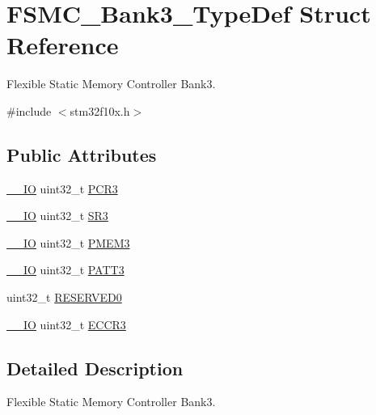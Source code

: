 \hypertarget{struct_f_s_m_c___bank3___type_def}{\section{F\-S\-M\-C\-\_\-\-Bank3\-\_\-\-Type\-Def Struct Reference}
\label{struct_f_s_m_c___bank3___type_def}
}


Flexible Static Memory Controller Bank3.  




{\ttfamily \#include $<$stm32f10x.\-h$>$}

\subsection*{Public Attributes}
\begin{DoxyCompactItemize}
\item 
\hyperlink{group___c_m_s_i_s__core__definitions_gaec43007d9998a0a0e01faede4133d6be}{\-\_\-\-\_\-\-I\-O} uint32\-\_\-t \hyperlink{struct_f_s_m_c___bank3___type_def_a1f772e1028641cab7b923bf02115b919}{P\-C\-R3}
\item 
\hyperlink{group___c_m_s_i_s__core__definitions_gaec43007d9998a0a0e01faede4133d6be}{\-\_\-\-\_\-\-I\-O} uint32\-\_\-t \hyperlink{struct_f_s_m_c___bank3___type_def_ab89f16f64018a1f1e55d36f92b84be94}{S\-R3}
\item 
\hyperlink{group___c_m_s_i_s__core__definitions_gaec43007d9998a0a0e01faede4133d6be}{\-\_\-\-\_\-\-I\-O} uint32\-\_\-t \hyperlink{struct_f_s_m_c___bank3___type_def_a756258d9266b1eee3455bc850107beb6}{P\-M\-E\-M3}
\item 
\hyperlink{group___c_m_s_i_s__core__definitions_gaec43007d9998a0a0e01faede4133d6be}{\-\_\-\-\_\-\-I\-O} uint32\-\_\-t \hyperlink{struct_f_s_m_c___bank3___type_def_a0cbf1b4647f98914238202828de47416}{P\-A\-T\-T3}
\item 
uint32\-\_\-t \hyperlink{struct_f_s_m_c___bank3___type_def_a2e9cac528ee7bfce11b0b9a36db3b954}{R\-E\-S\-E\-R\-V\-E\-D0}
\item 
\hyperlink{group___c_m_s_i_s__core__definitions_gaec43007d9998a0a0e01faede4133d6be}{\-\_\-\-\_\-\-I\-O} uint32\-\_\-t \hyperlink{struct_f_s_m_c___bank3___type_def_a6935beb5bbc2de668024c1989eecd46c}{E\-C\-C\-R3}
\end{DoxyCompactItemize}


\subsection{Detailed Description}
Flexible Static Memory Controller Bank3. 

